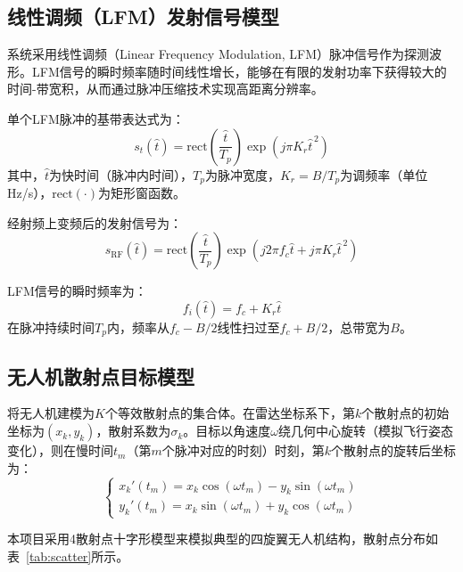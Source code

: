 \documentclass[12pt, a4paper]{article}
\begin{document}
\subsection{线性调频（LFM）发射信号模型}

系统采用线性调频（Linear Frequency Modulation, LFM）脉冲信号作为探测波形。LFM信号的瞬时频率随时间线性增长，能够在有限的发射功率下获得较大的时间-带宽积，从而通过脉冲压缩技术实现高距离分辨率。

单个LFM脉冲的基带表达式为：
\begin{equation}
  s_t(\hat{t}) = \mathrm{rect}\!\left(\frac{\hat{t}}{T_p}\right)
  \exp\!\left(j\pi K_r \hat{t}^{\,2}\right)
  \label{eq:lfm_baseband}
\end{equation}
其中，$\hat{t}$为快时间（脉冲内时间），$T_p$为脉冲宽度，$K_r = B/T_p$为调频率（单位Hz/s），$\mathrm{rect}(\cdot)$为矩形窗函数。

经射频上变频后的发射信号为：
\begin{equation}
  s_{\mathrm{RF}}(\hat{t}) = \mathrm{rect}\!\left(\frac{\hat{t}}{T_p}\right)
  \exp\!\left(j2\pi f_c \hat{t} + j\pi K_r \hat{t}^{\,2}\right)
  \label{eq:lfm_rf}
\end{equation}

LFM信号的瞬时频率为：
\begin{equation}
  f_i(\hat{t}) = f_c + K_r \hat{t}
  \label{eq:inst_freq}
\end{equation}
在脉冲持续时间$T_p$内，频率从$f_c - B/2$线性扫过至$f_c + B/2$，总带宽为$B$。

\subsection{无人机散射点目标模型}

将无人机建模为$K$个等效散射点的集合体。在雷达坐标系下，第$k$个散射点的初始坐标为$(x_k, y_k)$，散射系数为$\sigma_k$。目标以角速度$\omega$绕几何中心旋转（模拟飞行姿态变化），则在慢时间$t_m$（第$m$个脉冲对应的时刻）时刻，第$k$个散射点的旋转后坐标为：
\begin{equation}
  \begin{cases}
    x_k'(t_m) = x_k \cos(\omega t_m) - y_k \sin(\omega t_m) \\[4pt]
    y_k'(t_m) = x_k \sin(\omega t_m) + y_k \cos(\omega t_m)
  \end{cases}
  \label{eq:rotation}
\end{equation}

本项目采用4散射点十字形模型来模拟典型的四旋翼无人机结构，散射点分布如表~\ref{tab:scatter}所示。
\end{document}
